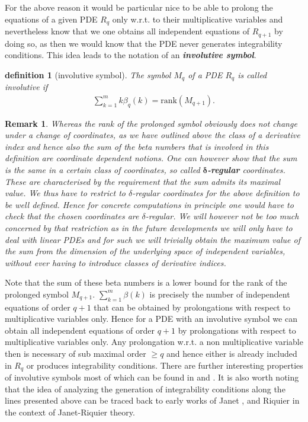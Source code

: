 \documentclass[a4paper,12pt, DIV=14, BCOR=5mm, twoside, headsepline, numbers=noenddot]{scrbook}
\newtheorem{definition}{definition}[section]
\newtheorem*{remark}{Remark}
\begin{document}
For the above reason it would be particular nice to be able to prolong the equations of a given PDE $R_q$ only w.r.t. to their multiplicative variables and nevertheless know that we one obtains all independent equations of $R_{q+1}$ by doing so, as then we would know that the PDE never generates integrability conditions. This idea leads to the notation of an \textit{\textbf{involutive symbol}}. 
\begin{definition}[involutive symbol]
The symbol $M_q$ of a PDE $R_q$ is called involutive if 
\begin{align}\label{sumBeta}
    \sum_{k=1}^m k\beta_q(k) = \mathrm{rank}(M_{q+1}).
\end{align}
\end{definition}
\begin{remark}
Whereas the rank of the prolonged symbol obviously does not change under a change of coordinates,
as we have outlined above the class of a derivative index and hence also the sum of the beta numbers that is involved in this definition are coordinate dependent notions. One can however show that the sum is the same in a certain class of coordinates, so called \textit{\textbf{$\boldsymbol{\delta}$-regular}} coordinates. These are characterised by the requirement that the sum admits its maximal value.
We thus have to restrict to $\delta$-regular coordinates for the above definition to be well defined.
Hence for concrete computations in principle one would have to check that the chosen coordinates are $\delta$-regular.  We will however not be too much concerned by that restriction as in the future developments we will only have to deal with linear PDEs and for such we will trivially obtain the maximum value of the sum from the dimension of the underlying space of independent variables, without ever having to introduce classes of derivative indices.
\end{remark}
Note that the sum of these beta numbers is a lower bound for the rank of the prolonged symbol $M_{q+1}$. $\sum_{k=1}^m \beta(k)$ is precisely the number of independent equations of order $q+1$ that can be obtained by prolongations with respect to multiplicative variables only.  
Hence for a PDE with an involutive symbol we can obtain all independent equations of order $q+1$ by prolongations with respect to multiplicative variables only. Any prolongation w.r.t. a non multiplicative variable then is necessary of sub maximal order $\geq q$ and hence either is already included in $R_q$ or produces integrability conditions. There are further interesting properties of involutive symbols most of which can be found in \cite{seiler2009involution} and \cite{seiler2009involution}. It is also worth noting that the idea of analyzing the generation of integrability conditions along the lines presented above can be traced back to early works of Janet \cite{janet1920systemes}, \cite{MSM_1927__21__1_0} and Riquier \cite{bateman_1910} in the context of Janet-Riquier theory.
\end{document}
